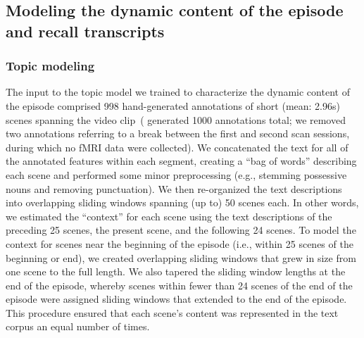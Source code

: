 \documentclass[10pt]{article}
\begin{document}
\subsection*{Modeling the dynamic content of the episode and recall transcripts}
\subsubsection*{Topic modeling}
The input to the topic model we trained to characterize the dynamic content of the episode comprised 998 hand-generated annotations of short (mean: 2.96s) scenes spanning the video clip~(\citealp{ChenEtal17} generated 1000 annotations total; we removed two annotations referring to a break between the first and second scan sessions, during which no fMRI data were collected).  We concatenated the text for all of the annotated features within each segment, creating a ``bag of words'' describing each scene and performed some minor preprocessing (e.g., stemming possessive nouns and removing punctuation).  We then re-organized the text descriptions into overlapping sliding windows spanning (up to) 50 scenes each.  In other words, we estimated the ``context'' for each scene using the text descriptions of the preceding 25 scenes, the present scene, and the following 24 scenes.  To model the context for scenes near the beginning of the episode (i.e., within 25 scenes of the beginning or end), we created overlapping sliding windows that grew in size from one scene to the full length.  We also tapered the sliding window lengths at the end of the episode, whereby scenes within fewer than 24 scenes of the end of the episode were assigned sliding windows that extended to the end of the episode.  This procedure ensured that each scene's content was represented in the text corpus an equal number of times.
\end{document}
